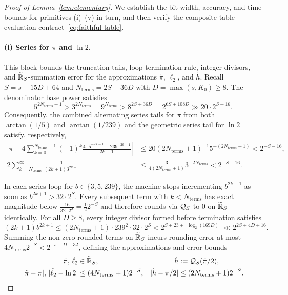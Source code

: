 \begin{proof}[Proof of Lemma~\ref{lem:elementary}]
We establish the bit-width, accuracy, and time bounds for primitives (i)--(v) in turn, and then verify the composite table-evaluation contract~\eqref{eq:faithful-table}.

\paragraph{(i) Series for $\pi$ and $\ln 2$.}
This block bounds the truncation tails, loop-termination rule, integer divisors, and $\widetilde{\mathbb{R}}_S$-summation error for the approximations $\tilde{\pi}$, $\tilde{\ell}_2$, and $\tilde{h}$.
Recall $S = s + 15D + 64$ and $N_{\mathrm{terms}} = 2S + 36D$ with $D = \max(s, K_0) \ge 8$. The denominator base power satisfies
\[
  5^{2N_{\mathrm{terms}}+1} > 3^{2N_{\mathrm{terms}}} = 9^{N_{\mathrm{terms}}} > 8^{2S+36D} = 2^{6S+108D} \gg 20 \cdot 2^{S+16}.
\]
Consequently, the combined alternating series tails for $\pi$ from both $\arctan(1/5)$ and $\arctan(1/239)$ and the geometric series tail for $\ln 2$ satisfy, respectively,
\begin{align*}
  \left|\pi - 4\sum_{k=0}^{N_{\mathrm{terms}}-1} (-1)^k \frac{4 \cdot 5^{-2k-1} - 239^{-2k-1}}{2k+1}\right|
    &\le 20(2N_{\mathrm{terms}}+1)^{-1} 5^{-(2N_{\mathrm{terms}}+1)} < 2^{-S-16}, \\
  2\sum_{k=N_{\mathrm{terms}}}^{\infty} \frac{1}{(2k+1)3^{2k+1}}
    &\le \frac{3}{4(2N_{\mathrm{terms}}+1)} 3^{-2N_{\mathrm{terms}}} < 2^{-S-16}.
\end{align*}

In each series loop for $b \in \{3, 5, 239\}$, the machine stops incrementing $b^{2k+1}$ as soon as $b^{2k+1} > 32 \cdot 2^S$. Every subsequent term with $k < N_{\mathrm{terms}}$ has exact magnitude below $\frac{16}{32 \cdot 2^S} = \frac{1}{2} 2^{-S}$ and therefore rounds via $\mathcal{Q}_S$ to $0$ on $\widetilde{\mathbb{R}}_S$ identically. For all $D \ge 8$, every integer divisor formed before termination satisfies
\[
  (2k+1)b^{2k+1} \le (2N_{\mathrm{terms}}+1)\cdot 239^2 \cdot 32 \cdot 2^S < 2^{S + 23 + \lceil\log_2(169 D)\rceil} \ll 2^{2S + 4D + 16}.
\]
Summing the non-zero rounded terms on $\widetilde{\mathbb{R}}_S$ incurs rounding error at most $4 N_{\mathrm{terms}} 2^{-S} < 2^{-s-D-32}$, defining the approximations and error bounds
\begin{align*}
  \tilde{\pi},\, \tilde{\ell}_2 &\in \widetilde{\mathbb{R}}_S, & \tilde{h} &:= \mathcal{Q}_S(\tilde{\pi}/2), \\
  |\tilde{\pi} - \pi|,\, |\tilde{\ell}_2 - \ln 2| &\le (4N_{\mathrm{terms}} + 1)2^{-S}, & |\tilde{h} - \pi/2| &\le (2N_{\mathrm{terms}} + 1)2^{-S}.
\end{align*}


\end{proof}
